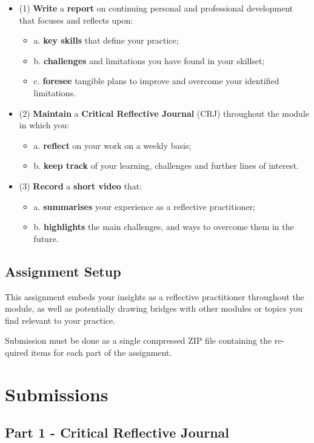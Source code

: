 \documentclass{../../fal_assignment_opendyslexic}
\begin{document}
\begin{itemize}
		\item (1)  \textbf{Write} a  \textbf{report} on continuing personal and professional development that focuses and reflects upon:
		\begin{itemize}
			\item a.  \textbf{key skills} that define your practice;
			\item b.  \textbf{challenges} and limitations you have found in your skillset;
			\item c.  \textbf{foresee} tangible plans to improve and overcome your identified limitations.
		\end{itemize}
		\item (2)  \textbf{Maintain} a \textbf{Critical Reflective Journal} (CRJ) throughout the module in which you:
		\begin{itemize}
			\item a.  \textbf{reflect} on your work on a weekly basis;
			\item b.  \textbf{keep track} of your learning, challenges and further lines of interest.
		\end{itemize}
		\item (3)  \textbf{Record} a  \textbf{short video} that:
		\begin{itemize}
			\item a.  \textbf{summarises} your experience as a reflective practitioner;
			\item b.  \textbf{highlights} the main challenges, and ways to overcome them in the future.
		\end{itemize}
\end{itemize}
\subsection*{Assignment Setup} 

This assignment embeds your insights as a reflective practitioner throughout the module, as well as potentially drawing bridges with other modules or topics you find relevant to your practice.

Submission must be done as a single compressed ZIP file containing the re- quired items for each part of the assignment.
\pagebreak
\section*{Submissions}
\subsection*{Part 1 - Critical Reflective Journal} 
\end{document}
